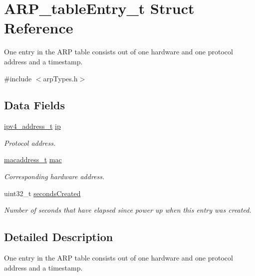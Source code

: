 \hypertarget{struct_a_r_p__table_entry__t}{}\section{A\+R\+P\+\_\+table\+Entry\+\_\+t Struct Reference}
\label{struct_a_r_p__table_entry__t}


One entry in the A\+RP table consists out of one hardware and one protocol address and a timestamp.  




{\ttfamily \#include $<$arp\+Types.\+h$>$}

\subsection*{Data Fields}
\begin{DoxyCompactItemize}
\item 
\mbox{\hyperlink{group__ipv4_gad9df0882950e70d0587a4b423beb261a}{ipv4\+\_\+address\+\_\+t}} \mbox{\hyperlink{struct_a_r_p__table_entry__t_a8788f788aa5f4c53d49e312f6589769a}{ip}}
\begin{DoxyCompactList}\small\item\em Protocol address. \end{DoxyCompactList}\item 
\mbox{\hyperlink{group__ethernet_gacb865bcbf50a6c8cef05581bfabff373}{macaddress\+\_\+t}} \mbox{\hyperlink{struct_a_r_p__table_entry__t_a815eb066061f1dd9afdb6c6eee48f46e}{mac}}
\begin{DoxyCompactList}\small\item\em Corresponding hardware address. \end{DoxyCompactList}\item 
uint32\+\_\+t \mbox{\hyperlink{struct_a_r_p__table_entry__t_a06c3d88e59b26905ae3d434ff0b6e23e}{seconds\+Created}}
\begin{DoxyCompactList}\small\item\em Number of seconds that have elapsed since power up when this entry was created. \end{DoxyCompactList}\end{DoxyCompactItemize}


\subsection{Detailed Description}
One entry in the A\+RP table consists out of one hardware and one protocol address and a timestamp. 

